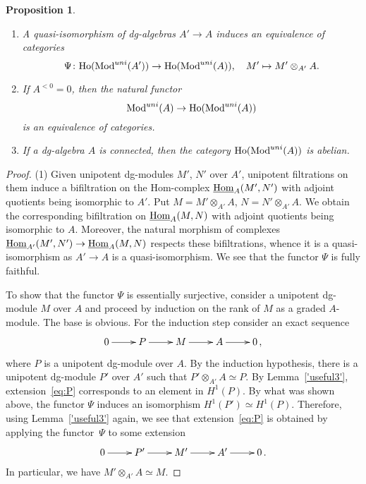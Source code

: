 \documentclass[10pt,russian]{article}
\theoremstyle{plain}
\newtheorem{prop}[theorem]{Proposition}
\theoremstyle{definition}
\newcommand{\Hom}{{\rm Hom}}
\newcommand{\Mod}{{\rm Mod}}
\newcommand{\Ho}{{\rm Ho}}
\begin{document}
\begin{prop}\label{prop:dg}
	\hspace{0cm}
\begin{enumerate}
	\item[(1)] A quasi-isomorphism of dg-algebras $A'\to A$ induces an equivalence of categories
	$$
	\Psi\colon \Ho(\Mod^{uni}(A')) \to \Ho(\Mod^{uni}(A)), \quad M' \mapsto M' \otimes_{A'} A.
	$$
	\item[(2)] If $A^{<0}=0$, then the natural functor
	$$
	\Mod^{uni}(A) \to \Ho(\Mod^{uni}(A))
	$$
	is an equivalence of categories.
	\item[(3)] If a dg-algebra $A$ is connected, then the category $\Ho(\Mod^{uni}(A))$ is abelian.
\end{enumerate}
\end{prop}
\begin{proof}

(1) Given unipotent dg-modules $M'$, $N'$ over $A'$, unipotent filtrations on them induce a bifiltration on the Hom-complex $\underline{\Hom}_A(M',N')$ with adjoint quotients being isomorphic to $A'$. Put $M=M'\otimes_{A'}A$, $N=N'\otimes_{A'}A$. We obtain the corresponding bifiltration on $\underline{\Hom}_A(M,N)$ with adjoint quotients being isomorphic to $A$. Moreover, the natural morphism of complexes ${\underline{\Hom}_{A'}(M',N')\to \underline{\Hom}_A(M,N)}$ respects these bifiltrations, whence it is a quasi-isomorphism as $A'\to A$ is a quasi-isomorphism. We see that the functor $\Psi$ is fully faithful.

To show that the functor $\Psi$ is essentially surjective, consider a unipotent dg-module $M$ over $A$ and proceed by induction on the rank of $M$ as a graded \mbox{$A$-module}. The base is obvious. For the induction step consider an exact sequence
\begin{equation}\label{eq:P}
 	\xymatrix{
 		 0 \ar[r] &  P  \ar[r] & M  \ar[r]  &  A \ar[r]& 0\,,
 	}
\end{equation}
where $P$ is a unipotent dg-module over $A$. By the induction hypothesis, there is a unipotent dg-module $P'$ over $A'$ such that $P'\otimes_{A'}A\simeq P$. By Lemma~\ref{'useful3'}, extension~\eqref{eq:P} corresponds to an element in $H^1(P)$. By what was shown above, the functor $\Psi$ induces an isomorphism $H^1(P')\simeq H^1(P)$. Therefore, using Lemma~\ref{'useful3'} again, we see that extension~\eqref{eq:P} is obtained by applying the functor~$\Psi$ to some extension
$$
 	\xymatrix{
 		 0 \ar[r] &  P'  \ar[r] & M' \ar[r]  &  A' \ar[r]& 0\,.
 	}
$$
In particular, we have $M'\otimes_{A'}A\simeq M$.


\end{proof}
\end{document}
